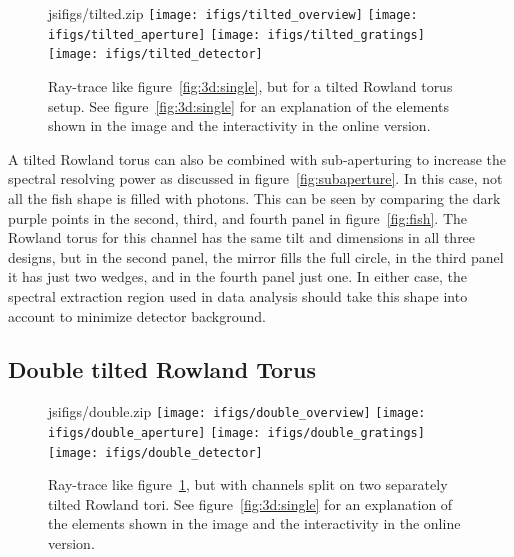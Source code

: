 \documentclass[linenumbers]{aastex631}
\begin{document}
\begin{figure}
    \begin{interactive}{js}{ifigs/tilted.zip}
    \texttt{[image: ifigs/tilted\_overview]}
    \texttt{[image: ifigs/tilted\_aperture]}
    \texttt{[image: ifigs/tilted\_gratings]}
    \texttt{[image: ifigs/tilted\_detector]}
    \end{interactive}
  \caption{Ray-trace like figure~\ref{fig:3d:single}, but for a tilted Rowland torus setup. See figure~\ref{fig:3d:single} for an explanation of the elements shown in the image and the interactivity in the online version.
  }
  \label{fig:3d:tilted}
  \end{figure}

A tilted Rowland torus can also be combined with sub-aperturing to increase the spectral resolving power as discussed in figure~\ref{fig:subaperture}. In this case, not all the fish shape is filled with photons. This can be seen by comparing the dark purple points in the second, third, and fourth panel in figure~\ref{fig:fish}. The Rowland torus for this channel has the same tilt and dimensions in all three designs, but in the second panel, the mirror fills the full circle, in the third panel it has just two wedges, and in the fourth panel just one. In either case, the spectral extraction region used in data analysis should take this shape into account to minimize detector background.

\subsection{Double tilted Rowland Torus}


\begin{figure}
    \begin{interactive}{js}{ifigs/double.zip}
    \texttt{[image: ifigs/double\_overview]}
    \texttt{[image: ifigs/double\_aperture]}
    \texttt{[image: ifigs/double\_gratings]}
    \texttt{[image: ifigs/double\_detector]}
    \end{interactive}
  \caption{Ray-trace like figure~\ref{fig:3d:tilted}, but with channels split on two separately tilted Rowland tori. See figure~\ref{fig:3d:single} for an explanation of the elements shown in the image and the interactivity in the online version.}
  \label{fig:3d:tilted_double}
\end{figure}
\end{document}
